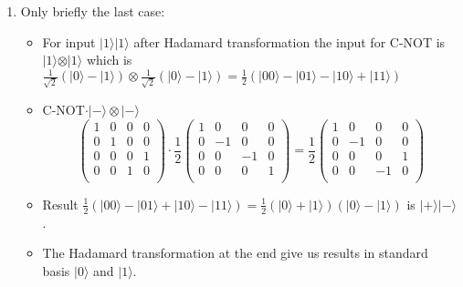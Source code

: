 \documentclass[a4paper,10pt]{article}
\newcommand{\qb}[1]{\ensuremath{\vert{#1}\rangle}}
\newcommand{\asp}{\ensuremath{\frac{1}{\sqrt{2}}}}
\newcommand{\ap}{\ensuremath{\frac{1}{2}}}
\begin{document}
\begin{enumerate}
\item Only briefly the last case:
\begin{itemize}
\item For input \qb{1}\qb{1} after Hadamard transformation the input for C-NOT is \qb{1}$\otimes$\qb{1} which is $\asp (\qb{0}-\qb{1})\otimes \asp (\qb{0}-\qb{1})= \ap (\qb{00} - \qb{01} - \qb{10} + \qb{11})$
\item C-NOT$\cdot\qb{-}\otimes\qb{-}$ 
$$
\left( \begin{array}{cccc}
1 & 0 & 0 & 0 \\
0 & 1 & 0 & 0 \\
0 & 0 & 0 & 1 \\
0 & 0 & 1 & 0 \\
\end{array} \right)
\cdot \ap
\left( \begin{array}{cccc}
1 & 0 & 0 & 0 \\
0 & -1 & 0 & 0 \\
0 & 0 & -1 & 0 \\
0 & 0 & 0 & 1 \\
\end{array} \right)
=
\ap
\left( \begin{array}{cccc}
1 & 0 & 0 & 0 \\
0 & -1 & 0 & 0 \\
0 & 0 & 0 & 1 \\
0 & 0 & -1 & 0 \\
\end{array} \right)
$$

\item Result $\ap (\qb{00} - \qb{01} + \qb{10} - \qb{11}) = \ap (\qb{0}+\qb{1}) (\qb{0}-\qb{1})$ is \qb{+}\qb{-}.
\item The Hadamard transformation at the end give us results in standard basis \qb{0} and \qb{1}.


\end{itemize}
\end{enumerate}
\end{document}

